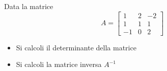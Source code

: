 Data la matrice
\[
A=\left[
\begin{array}{ccc}
1 & 2 & -2 \\
1 & 1 & 1\\
-1 & 0 & 2
\end{array}\right]
\]

\begin{itemize}
\item Si calcoli il determinante della matrice
\item Si calcoli la matrice inversa $A^{-1}$

\end{itemize}
